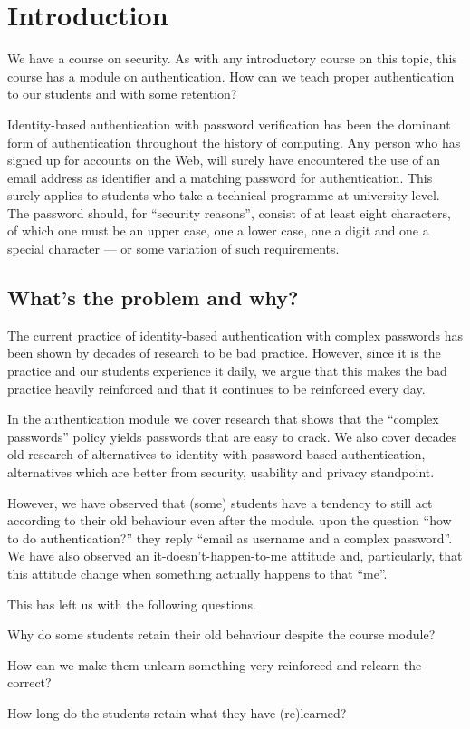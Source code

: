 \section{Introduction}

We have a course on security.
As with any introductory course on this topic, this course has a module on 
authentication.
How can we teach proper authentication to our students and with some retention?

Identity-based authentication with password verification has been the dominant 
form of authentication throughout the history of computing.
Any person who has signed up for accounts on the Web, will surely have 
encountered the use of an email address as identifier and a matching password 
for authentication.
This surely applies to students who take a technical programme at university 
level.
The password should, for \enquote{security reasons}, consist of at least eight 
characters, of which one must be an upper case, one a lower case, one a digit 
and one a special character --- or some variation of such requirements.

\subsection{What's the problem and why?}

The current practice of identity-based authentication with complex passwords 
has been shown by decades of research to be bad practice.
However, since it is the practice and our students experience it daily, we 
argue that this makes the bad practice heavily reinforced and that it continues 
to be reinforced every day.

In the authentication module we cover research that shows that the 
\enquote{complex passwords} policy yields passwords that are easy to crack.
We also cover decades old research of alternatives to identity-with-password 
based authentication, alternatives which are better from security, usability 
and privacy standpoint.

However, we have observed that (some) students have a tendency to still act 
according to their old behaviour even after the module.
\Ie upon the question \enquote{how to do authentication?} they reply 
\enquote{email as username and a complex password}.
We have also observed an it-doesn't-happen-to-me attitude and, particularly, 
that this attitude change when something actually happens to that \enquote{me}.

This has left us with the following questions.
\begin{rqs}
\item\label{rq-nochange}
  Why do some students retain their old behaviour despite the course module?

\item\label{rq-unlearn}
  How can we make them unlearn something very reinforced and relearn the 
  correct?

\item\label{rq-retention}
  How long do the students retain what they have (re)learned?
\end{rqs}

